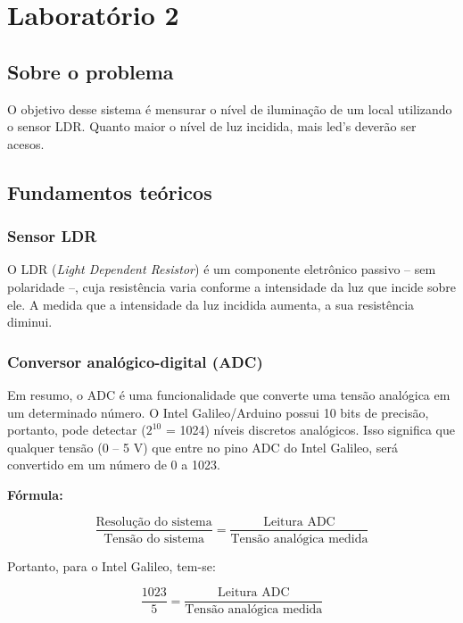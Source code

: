 \chapter{Laboratório 2}

\section{Sobre o problema}
O objetivo desse sistema é mensurar o nível de iluminação de um local utilizando o sensor LDR.
Quanto maior o nível de luz incidida, mais led's deverão ser acesos.

\section{Fundamentos teóricos}
\subsection{Sensor LDR}
O LDR (\textit{Light Dependent Resistor}) é um componente eletrônico passivo -- sem polaridade --, cuja resistência varia conforme a intensidade da luz que incide sobre ele.
A medida que a intensidade da luz incidida aumenta, a sua resistência diminui. \cite{https://pt.wikipedia.org/wiki/LDR}

\subsection{Conversor analógico-digital (ADC)}
Em resumo, o ADC é uma funcionalidade que converte uma tensão analógica em um determinado número. O Intel Galileo/Arduino possui 10 bits de precisão, portanto,
pode detectar ($2^{10}$ = 1024) níveis discretos analógicos. Isso significa que qualquer tensão (0 -- 5 V) que entre no pino ADC do Intel Galileo, será convertido em um
número de 0 a 1023. \cite{https://learn.sparkfun.com/tutorials/analog-to-digital-conversion}

\textbf{Fórmula:}

\begin{equation}
\frac{\textrm{Resolução do sistema}}{\textrm{Tensão do sistema}} = \frac{\textrm{Leitura ADC}}{\textrm{Tensão analógica medida}}
\end{equation}

Portanto, para o Intel Galileo, tem-se:

\begin{equation}
\frac{1023}{5} = \frac{\textrm{Leitura ADC}}{\textrm{Tensão analógica medida}}
\end{equation}


